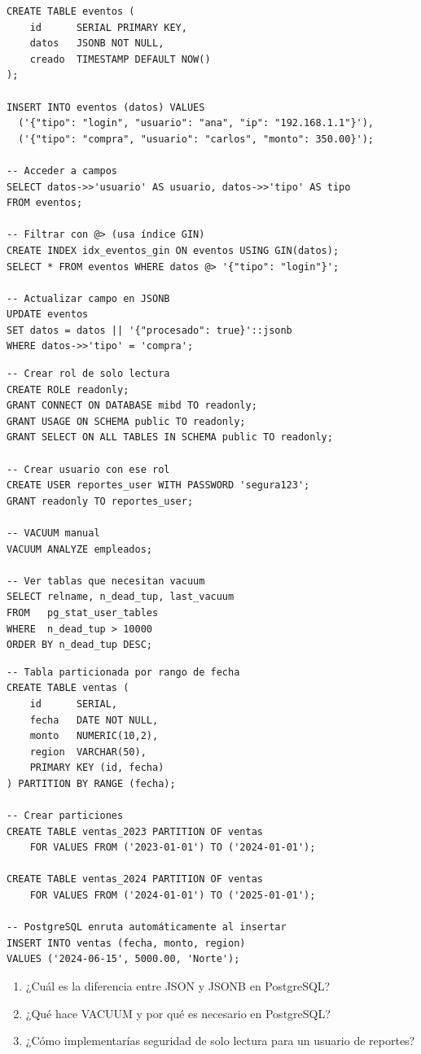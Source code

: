 \begin{lstlisting}[caption={JSONB --- consultas y operadores}]
CREATE TABLE eventos (
    id      SERIAL PRIMARY KEY,
    datos   JSONB NOT NULL,
    creado  TIMESTAMP DEFAULT NOW()
);

INSERT INTO eventos (datos) VALUES
  ('{"tipo": "login", "usuario": "ana", "ip": "192.168.1.1"}'),
  ('{"tipo": "compra", "usuario": "carlos", "monto": 350.00}');

-- Acceder a campos
SELECT datos->>'usuario' AS usuario, datos->>'tipo' AS tipo
FROM eventos;

-- Filtrar con @> (usa índice GIN)
CREATE INDEX idx_eventos_gin ON eventos USING GIN(datos);
SELECT * FROM eventos WHERE datos @> '{"tipo": "login"}';

-- Actualizar campo en JSONB
UPDATE eventos
SET datos = datos || '{"procesado": true}'::jsonb
WHERE datos->>'tipo' = 'compra';
\end{lstlisting}

\begin{lstlisting}[caption={Roles, permisos y VACUUM}]
-- Crear rol de solo lectura
CREATE ROLE readonly;
GRANT CONNECT ON DATABASE mibd TO readonly;
GRANT USAGE ON SCHEMA public TO readonly;
GRANT SELECT ON ALL TABLES IN SCHEMA public TO readonly;

-- Crear usuario con ese rol
CREATE USER reportes_user WITH PASSWORD 'segura123';
GRANT readonly TO reportes_user;

-- VACUUM manual
VACUUM ANALYZE empleados;

-- Ver tablas que necesitan vacuum
SELECT relname, n_dead_tup, last_vacuum
FROM   pg_stat_user_tables
WHERE  n_dead_tup > 10000
ORDER BY n_dead_tup DESC;
\end{lstlisting}

\begin{lstlisting}[caption={Particionamiento nativo en PostgreSQL}]
-- Tabla particionada por rango de fecha
CREATE TABLE ventas (
    id      SERIAL,
    fecha   DATE NOT NULL,
    monto   NUMERIC(10,2),
    region  VARCHAR(50),
    PRIMARY KEY (id, fecha)
) PARTITION BY RANGE (fecha);

-- Crear particiones
CREATE TABLE ventas_2023 PARTITION OF ventas
    FOR VALUES FROM ('2023-01-01') TO ('2024-01-01');

CREATE TABLE ventas_2024 PARTITION OF ventas
    FOR VALUES FROM ('2024-01-01') TO ('2025-01-01');

-- PostgreSQL enruta automáticamente al insertar
INSERT INTO ventas (fecha, monto, region)
VALUES ('2024-06-15', 5000.00, 'Norte');
\end{lstlisting}

\begin{entrevistabox}
\begin{enumerate}
  \item ¿Cuál es la diferencia entre JSON y JSONB en PostgreSQL?
  \item ¿Qué hace VACUUM y por qué es necesario en PostgreSQL?
  \item ¿Cómo implementarías seguridad de solo lectura para un usuario de reportes?
\end{enumerate}
\end{entrevistabox}

